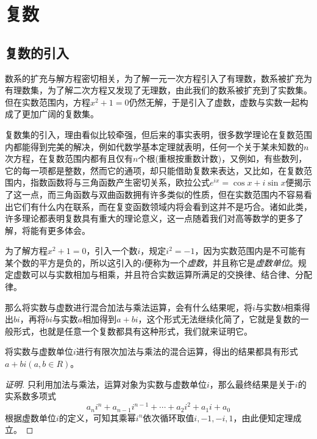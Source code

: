 


\section{复数}
\label{sec:complex-number}

\subsection{复数的引入}
\label{sec:import-complex-number}



数系的扩充与解方程密切相关，为了解一元一次方程引入了有理数，数系被扩充为有理数集，为了解二次方程又发现了无理数，由此我们的数系被扩充到了实数集。但在实数范围内，方程$x^2+1=0$仍然无解，于是引入了虚数，虚数与实数一起构成了更加广阔的复数集。

复数集的引入，理由看似比较牵强，但后来的事实表明，很多数学理论在复数范围内都能得到完美的解决，例如代数学基本定理就表明，任何一个关于某未知数的$n$次方程，在复数范围内都有且仅有$n$个根(重根按重数计数)，又例如，有些数列，它的每一项都是整数，然而它的通项，却只能借助复数来表达，又比如，在复数范围内，指数函数将与三角函数产生密切关系，欧拉公式$e^{ix}=\cos{x}+i\sin{x}$便揭示了这一点，而三角函数与双曲函数拥有许多类似的性质，但在实数范围内不容易看出它们有什么内在联系，而在复变函数领域内将会看到这并不是巧合。诸如此类，许多理论都表明复数具有重大的理论意义，这一点随着我们对高等数学的更多了解，将能有更多体会。

为了解方程$x^2+1=0$，引入一个数$i$，规定$i^2=-1$，因为实数范围内是不可能有某个数的平方是负的，所以这引入的$i$便称为一个\emph{虚数}，并且称它是\emph{虚数单位}。规定虚数可以与实数相加与相乘，并且符合实数运算所满足的交换律、结合律、分配律。

那么将实数与虚数进行混合加法与乘法运算，会有什么结果呢，将$i$与实数$b$相乘得出$bi$，再将$bi$与实数$a$相加得到$a+bi$，这个形式无法继续化简了，它就是复数的一般形式，也就是任意一个复数都具有这种形式，我们就来证明它。

\begin{theorem}
  将实数与虚数单位$i$进行有限次加法与乘法的混合运算，得出的结果都具有形式$a+bi(a,b\in R)$。
\end{theorem}

\begin{proof}[证明]
  只利用加法与乘法，运算对象为实数与虚数单位$i$，那么最终结果是关于$i$的实系数多项式
  \[ a_ni^n+a_{n-1}i^{n-1} + \cdots + a_2i^2 + a_1i+a_0 \]
  根据虚数单位$i$的定义，可知其乘幂$i^n$依次循环取值$i,-1,-i,1$，由此便知定理成立。
\end{proof}

